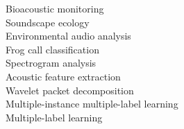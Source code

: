 %



\begin{keywords}
Bioacoustic monitoring \\
Soundscape ecology\\
Environmental audio analysis \\
Frog call classification \\
Spectrogram analysis \\
Acoustic feature extraction \\
Wavelet packet decomposition \\
Multiple-instance multiple-label learning \\
Multiple-label learning \\
 
\end{keywords}






